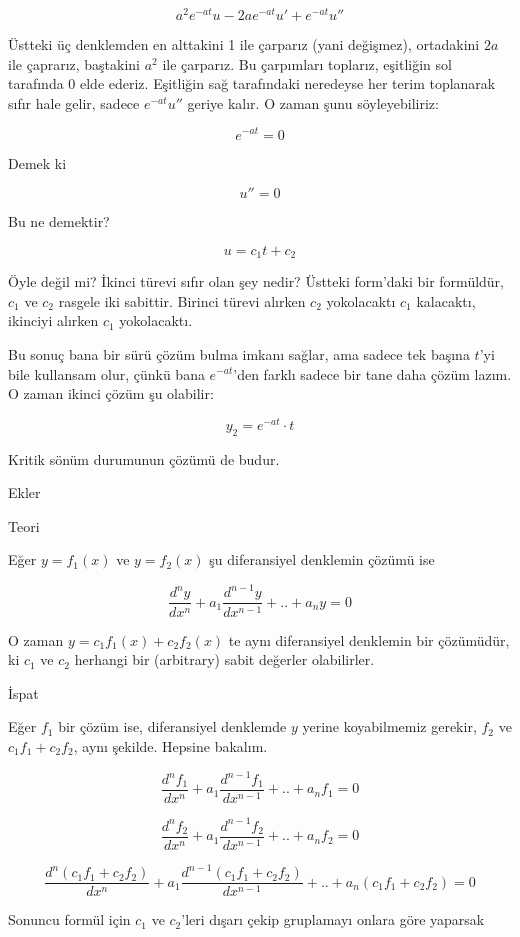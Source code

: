 \documentclass[12pt,fleqn]{article}\usepackage{../../common}
\begin{document}
$$ a^2e^{-at}u - 2ae^{-at}u' + e^{-at}u'' $$

Üstteki üç denklemden en alttakini 1 ile çarparız (yani değişmez), ortadakini
$2a$ ile çaprarız, baştakini $a^2$ ile çarparız. Bu çarpımları toplarız,
eşitliğin sol tarafında 0 elde ederiz. Eşitliğin sağ tarafındaki neredeyse her
terim toplanarak sıfır hale gelir, sadece $e^{-at}u''$ geriye kalır. O zaman
şunu söyleyebiliriz:

$$ e^{-at} = 0 $$

Demek ki 

$$ u'' = 0 $$

Bu ne demektir?

$$ u = c_1t + c_2 $$

Öyle değil mi? İkinci türevi sıfır olan şey nedir? Üstteki form'daki bir
formüldür, $c_1$ ve $c_2$ rasgele iki sabittir. Birinci türevi alırken $c_2$
yokolacaktı $c_1$ kalacaktı, ikinciyi alırken $c_1$ yokolacaktı.

Bu sonuç bana bir sürü çözüm bulma imkanı sağlar, ama sadece tek başına $t$'yi
bile kullansam olur, çünkü bana $e^{-at}$'den farklı sadece bir tane daha çözüm
lazım. O zaman ikinci çözüm şu olabilir:

$$ y_2 = e^{-at} \cdot t $$

Kritik sönüm durumunun çözümü de budur. 

Ekler

Teori

Eğer $y=f_1(x)$ ve $y=f_2(x)$ şu diferansiyel denklemin çözümü ise

$$ \frac{d^ny}{dx^n} + a_1 \frac{d^{n-1}y}{dx^{n-1}} + .. + a_n y = 0$$


O zaman $y=c_1f_1(x) + c_2f_2(x)$ te aynı diferansiyel denklemin bir çözümüdür,
ki $c_1$ ve $c_2$ herhangi bir (arbitrary) sabit değerler olabilirler.

İspat

Eğer $f_1$ bir çözüm ise, diferansiyel denklemde $y$ yerine koyabilmemiz
gerekir, $f_2$ ve $c_1f_1 + c_2f_2$, aynı şekilde. Hepsine bakalım.

$$ \frac{d^nf_1}{dx^n} + a_1 \frac{d^{n-1}f_1}{dx^{n-1}} + .. + a_n f_1 = 0$$

$$ \frac{d^nf_2}{dx^n} + a_1 \frac{d^{n-1}f_2}{dx^{n-1}} + .. + a_n f_2 = 0$$

$$ \frac{d^n(c_1f_1 + c_2f_2)}{dx^n} + 
a_1 \frac{d^{n-1}(c_1f_1 + c_2f_2)}{dx^{n-1}} + .. + 
a_n (c_1f_1 + c_2f_2) = 0
$$

Sonuncu formül için $c_1$ ve $c_2$'leri dışarı çekip gruplamayı onlara göre
yaparsak
\end{document}
